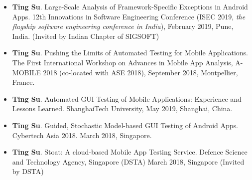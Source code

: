 \documentclass[margin]{res}
\begin{document}
\begin{resume}
\begin{itemize}[leftmargin=*]
    \item \textbf{Ting Su}. Large-Scale Analysis of Framework-Specific Exceptions in Android Apps. 12th Innovations in Software Engineering Conference (ISEC 2019, \emph{the flagship software engineering conference in India}), February 2019, Pune, India. (Invited by Indian Chapter of SIGSOFT)
    \item \textbf{Ting Su}. Pushing the Limits of Automated Testing for Mobile Applications. The First International Workshop on Advances in Mobile App Analysis, A-MOBILE 2018 (co-located with ASE 2018), September 2018, Montpellier, France.
    \item \textbf{Ting Su}. Automated GUI Testing of Mobile Applications: Experience and Lessons Learned. ShanghaiTech University, May 2019, Shanghai, China.
    \item \textbf{Ting Su}. Guided, Stochastic Model-based GUI Testing of Android Apps. Cybertech Asia 2018. March 2018, Singapore.
    \item \textbf{Ting Su}. Stoat: A cloud-based Mobile App Testing Service. Defence Science and Technology Agency, Singapore (DSTA) March 2018, Singapore (Invited by DSTA)
\end{itemize}


\end{resume}
\end{document}
